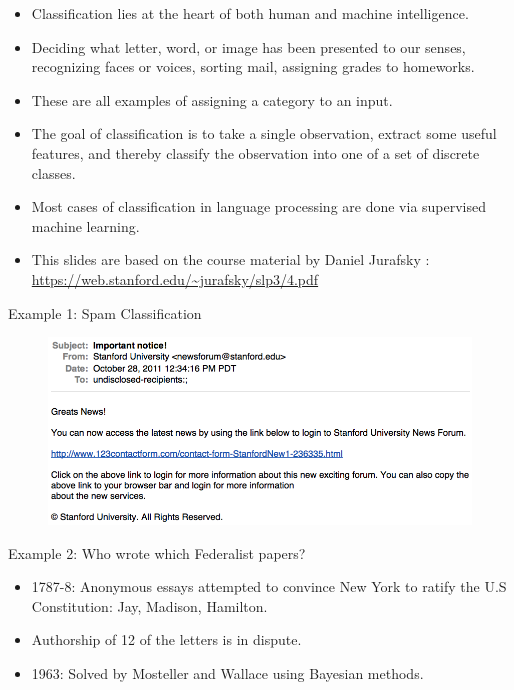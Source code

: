 
    \begin{itemize}
        \item Classification lies at the heart of both human and machine intelligence. 
        \item Deciding what letter, word, or image has been presented to our senses, recognizing faces or voices, sorting mail, assigning grades to homeworks.
        \item These are all examples of assigning a category to an input.
        \item The goal of classification is to take a single observation, extract some useful features, and thereby classify the observation into one of a set of discrete classes.
        \item  Most cases of classification in language processing are done via supervised machine learning. 
        \item This slides are based on the course material by Daniel Jurafsky : \url{https://web.stanford.edu/~jurafsky/slp3/4.pdf} 
    \end{itemize}   

Example 1: Spam Classification

\begin{figure}[h]
\includegraphics[scale = 0.35]{pics/spam.png}
\end{figure}


Example 2: Who wrote which Federalist papers?

    \begin{itemize}
        \item 1787-8: Anonymous essays attempted to convince New York to ratify the U.S Constitution: Jay, Madison, Hamilton.
        \item Authorship of 12 of the letters is in dispute.
        \item 1963: Solved by Mosteller and Wallace using Bayesian methods.
    \end{itemize}

